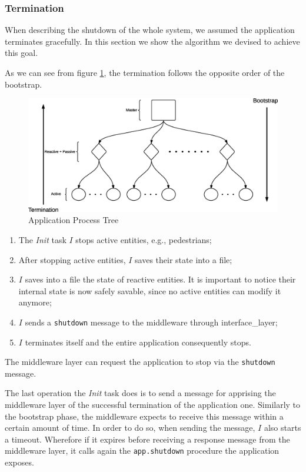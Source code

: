 \subsubsection{Termination}

When describing the shutdown of the whole system, we assumed the application
terminates gracefully.
In this section we show the algorithm we devised to achieve this goal.

As we can see from figure \ref{fig:app-proc-tree}, the termination follows the
opposite order of the bootstrap.

\begin{figure}[H]
  \centering
  \includegraphics[scale=0.4,keepaspectratio]
    {images/solution/app_proc_tree.eps}
  \caption{Application Process Tree}
  \label{fig:app-proc-tree}
\end{figure}

\begin{enumerate}
  \item The \textit{Init} task $I$ stops active entities, e.g., pedestrians;
  \item After stopping active entities, $I$ saves their state into a file;
  \item $I$ saves into a file the state of reactive entities.
    It is important to notice their internal state is now safely savable,
    since no active entities can modify it anymore;
  \item $I$ sends a \texttt{shutdown} message to the middleware through
  interface\_layer;
  \item $I$ terminates itself and the entire application consequently stops.
\end{enumerate}

The middleware layer can request the application to stop via the
\texttt{shutdown} message.

The last operation the \textit{Init} task does is to send a message for
apprising the middleware layer of the successful termination of the
application one.
Similarly to the bootstrap phase, the middleware expects to receive this
message within a certain amount of time.
In order to do so, when sending the message, $I$ also starts a timeout.
Wherefore if it expires before receiving a response message from the
middleware layer, it calls again the \texttt{app.shutdown} procedure the
application exposes.
